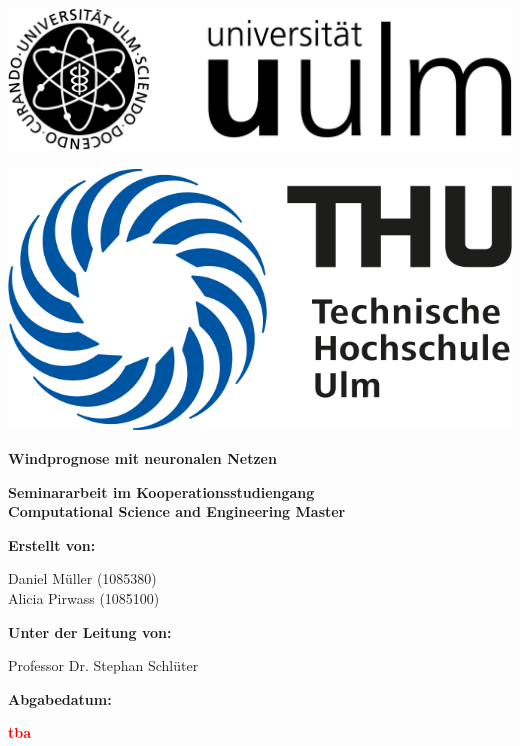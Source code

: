 \documentclass[
12pt, %
toc=listofnumbered, %
toc=chapterentrydotfill, %
numbers=noenddot, %
captions=tableheading, %
bibliography=numbered
]{scrreprt}
\newcommand{\highlight}[1]{\textbf{\textcolor{red}{#1}}}
\begin{document}
\begin{titlepage}
    \begin{center}
		\begin{minipage}[b]{\linewidth}
			\centering
			\begin{minipage}[b]{.4\linewidth}
				\includegraphics[width=.8\linewidth, left]{./images/logo_uu.png}
			\end{minipage}
			\hspace{.1\linewidth}%
			\begin{minipage}[b]{.4\linewidth}
				\includegraphics[width=.6\linewidth, right]{./images/logo_thu.png}
			\end{minipage}
		\end{minipage}
        
		\vspace{3cm}

        \Huge
		\textbf{Windprognose mit neuronalen Netzen}
            
        \vspace{1.5cm}
        \large
        \textbf{Seminararbeit im Kooperationsstudiengang}\\
		\textbf{Computational Science and Engineering Master}
    \end{center}        
	\vfill
	\large	
	\textbf{Erstellt von:}

	Daniel Müller (1085380)\\
	Alicia Pirwass (1085100)

	\vspace{1cm}
	\textbf{Unter der Leitung von:}

	Professor Dr. Stephan Schlüter

	\vspace{1cm}
	\textbf{Abgabedatum:}

	
\highlight{tba}
            
    
\end{titlepage}
\end{document}
